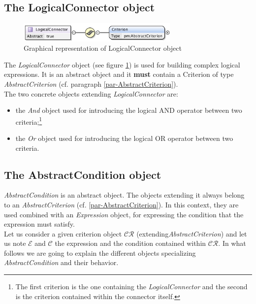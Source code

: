 \documentclass[a4paper,11pt] {ivoa}
\begin{document}
\subsection{The LogicalConnector object}\label{par-LogicalConnector}
\begin{figure}[htbp]
\begin{center}
\includegraphics[width=0.7\textwidth]{pictures/LogicalConnector.jpg} 
\caption{Graphical representation of LogicalConnector object}
\label{Pic-LogicalConnector}
\end{center}
\end{figure}
The {\it LogicalConnector} object (see figure \ref{Pic-LogicalConnector}) is used for building
complex logical expressions. It is an abstract object and it {\bf must} contain a Criterion
of type {\it AbstractCriterion} (cf. paragraph \ref{par-AbstractCriterion}).\\
The two concrete objects extending {\it LogicalConnector} are:
\begin{itemize}
\item the {\it And} object used for introducing the logical AND operator between two
criteria;\footnote{The first criterion is the one containing the {\it LogicalConnector} and the
second is the criterion contained within the connector itself.}
\item the {\it Or} object used for introducing the logical OR operator between two criteria.
\end{itemize}

\subsection{The AbstractCondition object}\label{par-ConditionType}
{\it AbstractCondition} is an abstract object. The objects extending it always belong to an  {\it 
AbstractCriterion} (cf. \ref{par-AbstractCriterion}). In this context, they are used combined with
an {\it Expression} object, for expressing the condition that the expression must satisfy.\\
Let us consider a given criterion object $\mathcal{CR}$ (extending{\it AbstractCriterion})  and let
us note $\mathcal E$ and $\mathcal C$ the expression and the condition contained within
$\mathcal{CR}$.
In what follows we are going to explain the different objects specializing  {\it AbstractCondition}
and their behavior.
\end{document}
